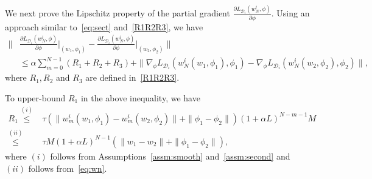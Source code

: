 \documentclass{osudissert96}
\begin{document}
We next prove the Lipschitz property of the partial gradient $\frac{\partial L_{\mathcal{D}_i}( w^i_N, \phi)}{\partial \phi}$. Using an approach similar to~\cref{eq:sect} and~\cref{R1R2R3}, we have 
\begin{align}\label{eq:qopqop}
\Big\|&\frac{\partial L_{\mathcal{D}_i}( w^i_N, \phi)}{\partial \phi}\Big |_{(w_1,\phi_1)}  - \frac{\partial L_{\mathcal{D}_i}( w^i_N, \phi)}{\partial \phi} \Big |_{(w_2,\phi_2)}\Big\| \nonumber
\\&\leq \alpha\sum_{m=0}^{N-1}(R_1+R_2+R_3) +\|\nabla_\phi L_{\mathcal{D}_i}(w_{N}^i(w_1,\phi_1),\phi_1)-\nabla_\phi L_{\mathcal{D}_i}(w_{N}^i(w_2,\phi_2),\phi_2)\|,
\end{align}
where $R_1,R_2$ and $R_3$ are defined in~\cref{R1R2R3}.

To upper-bound $R_1$ in the above inequality, we have
\begin{align}\label{R1}
R_1\overset{(i)}\leq &\tau (\|w_m^i(w_1,\phi_1)-w_m^i(w_2,\phi_2)\| + \|\phi_1-\phi_2\|) (1+\alpha L)^{N-m-1} M \nonumber
\\\overset{(ii)}\leq& \tau M (1+\alpha L)^{N-1} (\|w_1-w_2\| + \|\phi_1-\phi_2\|),
\end{align}
where $(i)$ follows from Assumptions~\ref{assm:smooth} and~\ref{assm:second} and $(ii)$ follows from~\cref{eq:wn}.
\end{document}
